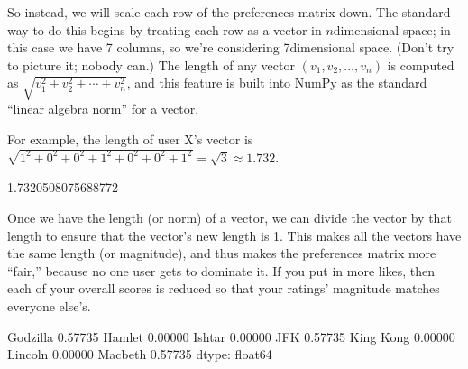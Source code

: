 \documentclass[letterpaper,10pt,english]{jupyterBook}
\begin{document}
\sphinxAtStartPar
So instead, we will scale each row of the preferences matrix down.  The standard way to do this begins by treating each row as a vector in \(n\)\sphinxhyphen{}dimensional space; in this case we have 7 columns, so we’re considering 7\sphinxhyphen{}dimensional space.  (Don’t try to picture it; nobody can.)  The length of any vector \((v_1,v_2,\ldots,v_n)\) is computed as \(\sqrt{v_1^2+v_2^2+\cdots+v_n^2}\), and this feature is built into NumPy as the standard “linear algebra norm” for a vector.

\sphinxAtStartPar
For example, the length of user X’s vector is \(\sqrt{1^2+0^2+0^2+1^2+0^2+0^2+1^2}=\sqrt{3}\approx1.732\).

\begin{sphinxVerbatim}[commandchars=\\\{\}]
   
  
\end{sphinxVerbatim}

\begin{sphinxVerbatim}[commandchars=\\\{\}]
1.7320508075688772
\end{sphinxVerbatim}

\sphinxAtStartPar
Once we have the length (or norm) of a vector, we can divide the vector by that length to ensure that the vector’s new length is 1.  This makes all the vectors have the same length (or magnitude), and thus makes the preferences matrix more “fair,” because no one user gets to dominate it.  If you put in more likes, then each of your overall scores is reduced so that your ratings’ magnitude matches everyone else’s.

\begin{sphinxVerbatim}[commandchars=\\\{\}]
      
\end{sphinxVerbatim}

\begin{sphinxVerbatim}[commandchars=\\\{\}]
Godzilla     0.57735
Hamlet       0.00000
Ishtar       0.00000
JFK          0.57735
King Kong    0.00000
Lincoln      0.00000
Macbeth      0.57735
dtype: float64
\end{sphinxVerbatim}
\end{document}
